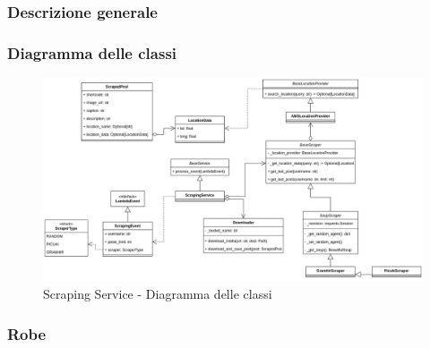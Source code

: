 \subsubsection{Descrizione generale}

\subsubsection{Diagramma delle classi}
\begin{figure}[!h]
    \includegraphics[width=14cm]{sezioni/images/cd_scraping.png}
    \centering
    \caption{Scraping Service - Diagramma delle classi}
\end{figure}

\subsubsection{Robe}
